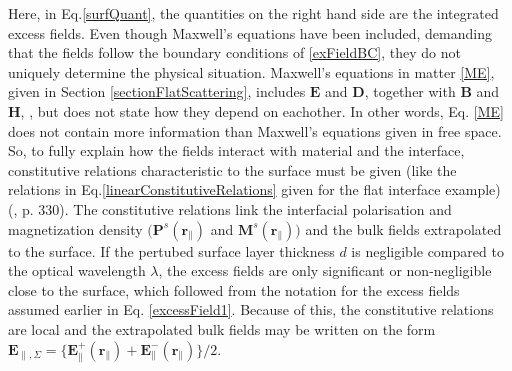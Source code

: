 Here, in Eq.\eqref{surfQuant}, the quantities on the right hand side
are the integrated excess fields.
%
%
Even though Maxwell's equations have been included, demanding that the fields follow the boundary 
conditions of \eqref{exFieldBC}, they do not uniquely determine the physical situation. 
Maxwell's equations in matter \eqref{ME}, given in Section \ref{sectionFlatScattering}, includes
$\boldsymbol{E}$ and $\boldsymbol{D}$, together with $\boldsymbol{B}$ and $\boldsymbol{H}$, 
, but does not state how they depend on eachother. In other words, Eq. \eqref{ME} does not contain
more information than Maxwell's equations given in free space. So, to fully explain how 
the fields interact with material and the interface, constitutive relations characteristic 
to the surface must be given (like the relations in Eq.\eqref{linearConstitutiveRelations} 
given for the flat interface example) (\cite{Griffiths}, p. 330).
The constitutive relations link the interfacial polarisation and 
magnetization density $\big(\boldsymbol{P}^s(\boldsymbol{r}_{\parallel})$ and 
$\boldsymbol{M}^s(\boldsymbol{r}_{\parallel}) \big)$ and the bulk fields extrapolated to the surface.
%
If the pertubed surface layer thickness $d$ is negligible compared to the optical wavelength $\lambda$,
the excess fields are only significant or non-negligible close to the surface, which followed
from the notation for the excess fields assumed earlier in Eq. \eqref{excessField1}.
Because of this, the constitutive relations are local and the extrapolated bulk fields may be written on the 
form 
$\boldsymbol{E}_{\parallel, \Sigma} = \big\{ \boldsymbol{E}^+_{\parallel} \!( \boldsymbol{r}\!_{\parallel} ) 
+  \boldsymbol{E}^-_{\parallel} \! (\boldsymbol{r}\!_{\parallel}) \big\} \big/2 $.
